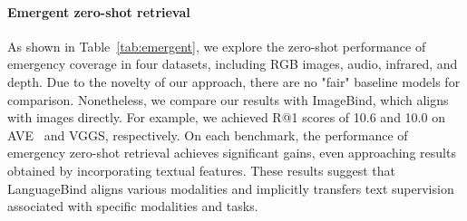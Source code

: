 \documentclass{article} \usepackage{iclr2024_conference,times}
\begin{document}
\paragraph{Emergent zero-shot retrieval} As shown in Table~\ref{tab:emergent}, we explore the zero-shot performance of emergency coverage in four datasets, including RGB images, audio, infrared, and depth. Due to the novelty of our approach, there are no "fair" baseline models for comparison. Nonetheless, we compare our results with ImageBind, which aligns with images directly. For example, we achieved R@1 scores of 10.6 and 10.0 on AVE~\citep{tian2018audio} and VGGS, respectively. On each benchmark, the performance of emergency zero-shot retrieval achieves significant gains, even approaching results obtained by incorporating textual features. These results suggest that LanguageBind aligns various modalities and implicitly transfers text supervision associated with specific modalities and tasks.
\end{document}
